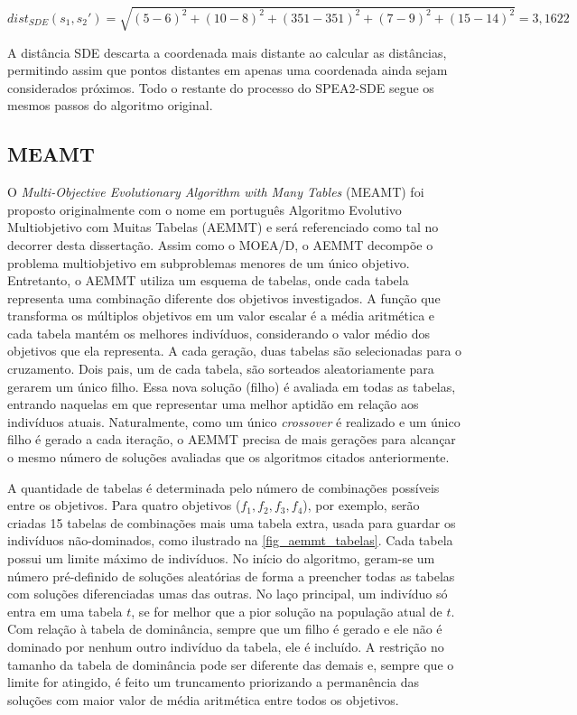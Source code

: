 \begin{equation}dist_{SDE}(s_1, s_2') = \sqrt{(5-6)^2 + (10-8)^2 + (351-351)^2 + (7-9)^2 + (15-14)^2} = 3,1622\end{equation}

A distância SDE descarta a coordenada mais distante ao calcular as distâncias, permitindo assim que pontos distantes em apenas uma coordenada ainda sejam considerados próximos. Todo o restante do processo do SPEA2-SDE segue os mesmos passos do algoritmo original.

\subsection{MEAMT}

O \textit{Multi-Objective Evolutionary Algorithm with Many Tables} (MEAMT) \cite{Brasil2013} foi proposto originalmente com o nome em português Algoritmo Evolutivo Multiobjetivo com Muitas Tabelas (AEMMT) e será referenciado como tal no decorrer desta dissertação. Assim como o MOEA/D, o AEMMT decompõe o problema multiobjetivo em subproblemas menores de um único objetivo. Entretanto, o AEMMT utiliza um esquema de tabelas, onde cada tabela representa uma combinação diferente dos objetivos investigados. A função que transforma os múltiplos objetivos em um valor escalar é a média aritmética e cada tabela mantém os melhores indivíduos, considerando o valor médio dos objetivos que ela representa. A cada geração, duas tabelas são selecionadas para o cruzamento. Dois pais, um de cada tabela, são sorteados aleatoriamente para gerarem um único filho. Essa nova solução (filho) é avaliada em todas as tabelas, entrando naquelas em que representar uma melhor aptidão em relação aos indivíduos atuais. Naturalmente, como um único \textit{crossover} é realizado e um único filho é gerado a cada iteração, o AEMMT precisa de mais gerações para alcançar o mesmo número de soluções avaliadas que os algoritmos citados anteriormente.

A quantidade de tabelas é determinada pelo número de combinações possíveis entre os objetivos. Para quatro objetivos ($f_1, f_2, f_3, f_4$), por exemplo, serão criadas 15 tabelas de combinações mais uma tabela extra, usada para guardar os indivíduos não-dominados, como ilustrado na \autoref{fig_aemmt_tabelas}. Cada tabela possui um limite máximo de indivíduos. No início do algoritmo, geram-se um número pré-definido de soluções aleatórias de forma a preencher todas as tabelas com soluções diferenciadas umas das outras. No laço principal, um indivíduo só entra em uma tabela $t$, se for melhor que a pior solução na população atual de $t$. Com relação à tabela de dominância, sempre que um filho é gerado e ele não é dominado por nenhum outro indivíduo da tabela, ele é incluído. A restrição no tamanho da tabela de dominância pode ser diferente das demais e, sempre que o limite for atingido, é feito um truncamento priorizando a permanência das soluções com maior valor de média aritmética entre todos os objetivos.

